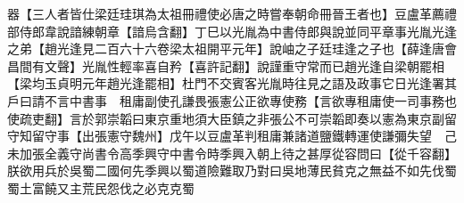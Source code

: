 器【三人者皆仕梁廷珪琪為太祖冊禮使必唐之時嘗奉朝命冊晉王者也】豆盧革薦禮部侍郎韋說諳練朝章【諳烏含翻】丁巳以光胤為中書侍郎與說並同平章事光胤光逢之弟【趙光逢見二百六十六卷梁太祖開平元年】說岫之子廷珪逢之子也【薛逢唐會昌間有文聲】光胤性輕率喜自矜【喜許記翻】說謹重守常而已趙光逢自梁朝罷相【梁均玉貞明元年趙光逢罷相】杜門不交賓客光胤時往見之語及政事它日光逢署其戶曰請不言中書事　租庸副使孔謙畏張憲公正欲專使務【言欲專租庸使一司事務也使疏吏翻】言於郭崇韜曰東京重地須大臣鎮之非張公不可崇韜即奏以憲為東京副留守知留守事【出張憲守魏州】戊午以豆盧革判租庸兼諸道鹽鐵轉運使謙彌失望　己未加張全義守尚書令高季興守中書令時季興入朝上待之甚厚從容問曰【從千容翻】朕欲用兵於吳蜀二國何先季興以蜀道險難取乃對曰吳地薄民貧克之無益不如先伐蜀蜀土富饒又主荒民怨伐之必克克蜀